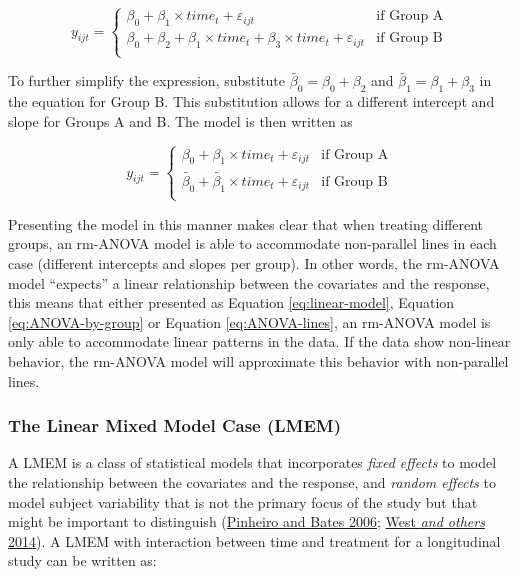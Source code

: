 \documentclass[
]{article}
\begin{document}
\begin{equation}
y_{ijt} = \begin{cases}
\beta_0 + \beta_1\times time_{t}+\varepsilon_{ijt}   & \mbox{if Group A}\\
\beta_0 + \beta_2+\beta_1 \times time_{t} +\beta_3 \times time_{t}+\varepsilon_{ijt}  & \mbox{if Group B}\\
\end{cases}
\label{eq:ANOVA-by-group}
\end{equation}

To further simplify the expression, substitute \(\widetilde{\beta_{0}}=\beta_0+\beta_{2}\) and \(\widetilde{\beta_{1}}=\beta_{1}+\beta_{3}\) in the equation for Group B. This substitution allows for a different intercept and slope for Groups A and B. The model is then written as

\begin{equation}
y_{ijt} = \begin{cases}
\beta_0 + \beta_1\times time_{t}+\varepsilon_{ijt}   & \mbox{if Group A}\\
\widetilde{\beta_{0}} + \widetilde{\beta_1} \times time_{t}+\varepsilon_{ijt}  & \mbox{if Group B}\\
\end{cases}
\label{eq:ANOVA-lines}
\end{equation}

Presenting the model in this manner makes clear that when treating different groups, an rm-ANOVA model is able to accommodate non-parallel lines in each case (different intercepts and slopes per group). In other words, the rm-ANOVA model ``expects'' a linear relationship between the covariates and the response, this means that either presented as Equation \eqref{eq:linear-model}, Equation \eqref{eq:ANOVA-by-group} or Equation \eqref{eq:ANOVA-lines}, an rm-ANOVA model is only able to accommodate linear patterns in the data. If the data show non-linear behavior, the rm-ANOVA model will approximate this behavior with non-parallel lines.

\hypertarget{the-linear-mixed-model-case-lmem}{%
\subsubsection{The Linear Mixed Model Case (LMEM)}\label{the-linear-mixed-model-case-lmem}}

A LMEM is a class of statistical models that incorporates \emph{fixed effects} to model the relationship between the covariates and the response, and \emph{random effects} to model subject variability that is not the primary focus of the study but that might be important to distinguish (\protect\hyperlink{ref-pinheiro2006}{Pinheiro and Bates 2006}; \protect\hyperlink{ref-west2014}{West \emph{and others} 2014}). A LMEM with interaction between time and treatment for a longitudinal study can be written as:
\end{document}
